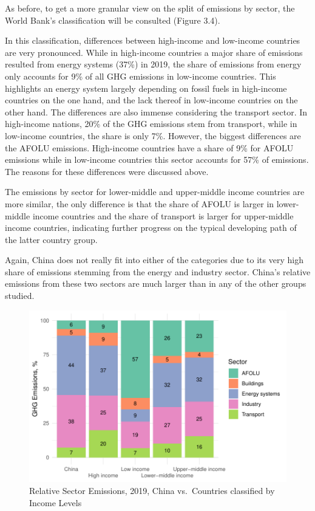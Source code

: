 \documentclass[
  12pt,
]{article}
\numberwithin{equation}{section}
\numberwithin{table}{section}
\numberwithin{figure}{section}
\begin{document}
As before, to get a more granular view on the split of emissions by
sector, the World Bank's classification will be consulted (Figure 3.4).

In this classification, differences between high-income and low-income
countries are very pronounced. While in high-income countries a major
share of emissions resulted from energy systems (37\%) in 2019, the
share of emissions from energy only accounts for 9\% of all GHG
emissions in low-income countries. This highlights an energy system
largely depending on fossil fuels in high-income countries on the one
hand, and the lack thereof in low-income countries on the other hand.
The differences are also immense considering the transport sector. In
high-income nations, 20\% of the GHG emissions stem from transport,
while in low-income countries, the share is only 7\%. However, the
biggest differences are the AFOLU emissions. High-income countries have
a share of 9\% for AFOLU emissions while in low-income countries this
sector accounts for 57\% of emissions. The reasons for these differences
were discussed above.

The emissions by sector for lower-middle and upper-middle income
countries are more similar, the only difference is that the share of
AFOLU is larger in lower-middle income countries and the share of
transport is larger for upper-middle income countries, indicating
further progress on the typical developing path of the latter country
group.

Again, China does not really fit into either of the categories due to
its very high share of emissions stemming from the energy and industry
sector. China's relative emissions from these two sectors are much
larger than in any of the other groups studied.

\begin{figure}
\centering
\includegraphics{Paper_files/figure-latex/unnamed-chunk-7-1.pdf}
\caption{Relative Sector Emissions, 2019, China vs.~Countries classified
by Income Levels}
\end{figure}
\end{document}
